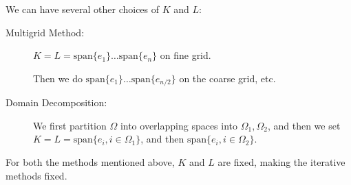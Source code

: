 \documentclass[../main/main.tex]{subfiles}
\begin{document}
We can have several other choices of $K$ and $L$:
\begin{description}
  \item[Multigrid Method:] $K=L=\text{span}\{e_{1}\} \ldots \text{span}\{e_{n}\}$ on fine grid.

        Then we do $\text{span}\{e_{1}\} \ldots \text{span}\{e_{n / 2}\}$ on the coarse grid, etc.
\item[Domain Decomposition:]  We first partition $\Omega$ into overlapping spaces into $\Omega_{1}, \Omega_{2}$, and then we set $K=L=\text{span}\{e_{i}, i\in \Omega_{1}\}$, and then $\text{span}\{e_{i}, i \in \Omega _{2}\}$.
\end{description}
        \begin{remark}
          For both the methods mentioned above, $K$ and $L$ are fixed, making the iterative methods fixed.
        \end{remark}
\end{document}

